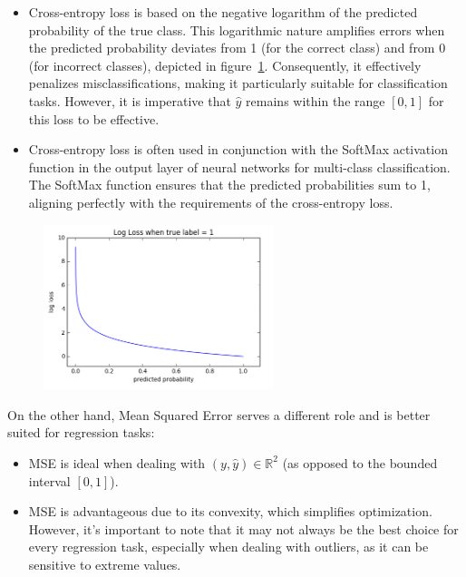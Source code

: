 \documentclass{article}
\theoremstyle{plain}%
\theoremstyle{definition}
\theoremstyle{remark}
\begin{document}
\begin{itemize}
    \item Cross-entropy loss is based on the negative logarithm of the predicted probability of the true class. This logarithmic nature amplifies errors when the predicted probability deviates from 1 (for the correct class) and from 0 (for incorrect classes), depicted in figure~\ref{fig:CELoss}. Consequently, it effectively penalizes misclassifications, making it particularly suitable for classification tasks. However, it is imperative that $\hat{y}$ remains within the range $[0, 1]$ for this loss to be effective.
    \item Cross-entropy loss is often used in conjunction with the SoftMax activation function in the output layer of neural networks for multi-class classification. The SoftMax function ensures that the predicted probabilities sum to 1, aligning perfectly with the requirements of the cross-entropy loss.
\end{itemize}

\begin{figure}[H]
    \centering
    \includegraphics*[width=0.6\textwidth]{figs/cross_entropy.png}
    \caption{}
    \label{fig:CELoss}
\end{figure}

On the other hand, Mean Squared Error serves a different role and is better suited for regression tasks:

\begin{itemize}
    \item MSE is ideal when dealing with $(y, \hat{y}) \in \mathbb{R}^2$ (as opposed to the bounded interval $[0, 1]$).
    \item MSE is advantageous due to its convexity, which simplifies optimization. However, it's important to note that it may not always be the best choice for every regression task, especially when dealing with outliers, as it can be sensitive to extreme values.
\end{itemize}
\end{document}
